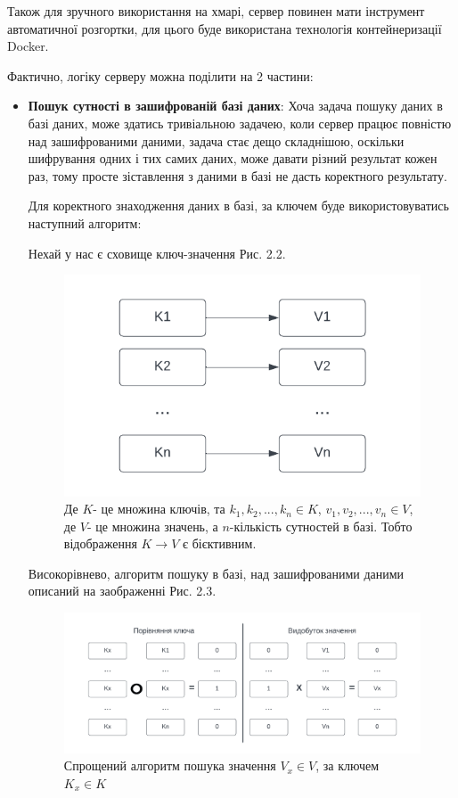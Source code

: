 Також для зручного використання на хмарі, сервер повинен мати інструмент автоматичної розгортки,
для цього буде використана технологія контейнеризації Docker.

Фактично, логіку серверу можна поділити на 2 частини:
\begin{itemize}
    \item{\textbf{Пошук сутності в зашифрованій базі даних}: Хоча задача пошуку даних в базі
даних, може здатись тривіальною задачею, коли сервер працює повністю над зашифрованими даними,
задача стає дещо складнішою, оскільки шифрування одних і тих самих даних, може давати різний
результат кожен раз, тому просте зіставлення з даними в базі не дасть коректного результату.

Для коректного знаходження даних в базі, за ключем буде використовуватись наступний алгоритм:

Нехай у нас є сховище ключ-значення Рис. 2.2.


\begin{figure}[!ht]
    \centering
    \label{fig:key-value-storage}
    \includegraphics[scale=1.25]{static/key-value-storage.png}
    \caption{Де \(K\)- це множина ключів, та \(k_1,k_2,...,k_n \in K\), \(v_1, v_2,...,v_n 
    \in V\), де \(V\)- це множина значень, а \(n\)-кількість сутностей в базі. Тобто
    відображення \(K \rightarrow V\) є бієктивним.}
\end{figure}

    Високорівнево, алгоритм пошуку в базі, над зашифрованими даними описаний на заображенні
    Рис. 2.3.

\begin{figure}[!ht]
    \label{fig:basic-value-extraction}
    \includegraphics[scale=0.85]{static/basic-value-extraction.png} 
    \caption{Спрощений алгоритм пошука значення \(V_x \in V\), за ключем \(K_x \in K\)}
\end{figure}

}
\end{itemize}
